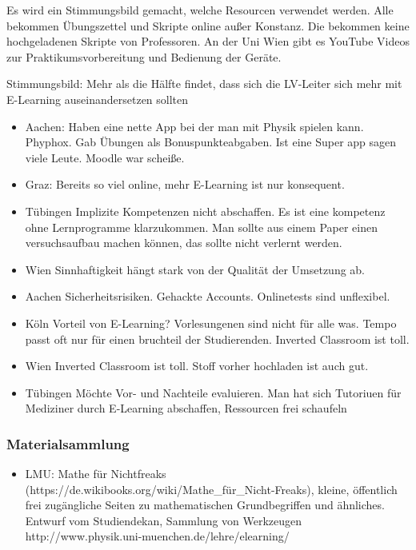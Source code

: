 \begin{itemize}
{	Es wird ein Stimmungsbild gemacht, welche Resourcen verwendet werden. Alle bekommen Übungszettel und Skripte online außer Konstanz. Die bekommen keine hochgeladenen Skripte von Professoren. An der Uni Wien gibt es YouTube Videos zur Praktikumsvorbereitung und Bedienung der Ger\"ate.

	Stimmungsbild: Mehr als die Hälfte findet, dass sich die LV-Leiter sich mehr mit E-Learning auseinandersetzen sollten

	\begin{itemize}
		\item Aachen: Haben eine nette App bei der man mit Physik spielen kann. Phyphox. Gab Übungen als Bonuspunkteabgaben. Ist eine Super app sagen viele Leute. Moodle war scheiße.
		\item Graz: Bereits so viel online, mehr E-Learning ist nur konsequent.
		\item Tübingen
		Implizite Kompetenzen nicht abschaffen. Es ist eine kompetenz ohne Lernprogramme klarzukommen. Man sollte aus einem Paper einen versuchsaufbau machen können, das sollte nicht verlernt werden.

		\item Wien
		Sinnhaftigkeit hängt stark von der Qualität der Umsetzung ab.

		\item Aachen
		Sicherheitsrisiken. Gehackte Accounts. Onlinetests sind unflexibel.

		\item Köln
		Vorteil von E-Learning?
		Vorlesungenen sind nicht für alle was. Tempo passt oft nur für einen bruchteil der Studierenden.
		Inverted Classroom ist toll.

		\item Wien
		Inverted Classroom ist toll. Stoff vorher hochladen ist auch gut.

		\item Tübingen
		Möchte Vor- und Nachteile evaluieren. Man hat sich Tutoriuen für Mediziner durch E-Learning abschaffen, Ressourcen frei schaufeln
	\end{itemize}

\subsubsection*{Materialsammlung}
	\begin{itemize}
		\item LMU: Mathe für Nichtfreaks (https://de.wikibooks.org/wiki/Mathe_für_Nicht-Freaks), kleine, öffentlich frei zugängliche Seiten zu mathematischen Grundbegriffen und \"ahnliches.
			Entwurf vom Studiendekan, Sammlung von Werkzeugen
			http://www.physik.uni-muenchen.de/lehre/elearning/\\


\end{itemize}}
\end{itemize}
